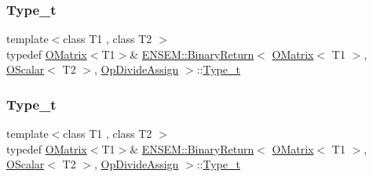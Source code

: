 \subsubsection{\texorpdfstring{Type\_t}{Type\_t}\hspace{0.1cm}{\footnotesize\ttfamily [1/3]}}
{\footnotesize\ttfamily template$<$class T1 , class T2 $>$ \\
typedef \mbox{\hyperlink{classENSEM_1_1OMatrix}{O\+Matrix}}$<$T1$>$\& \mbox{\hyperlink{structENSEM_1_1BinaryReturn}{E\+N\+S\+E\+M\+::\+Binary\+Return}}$<$ \mbox{\hyperlink{classENSEM_1_1OMatrix}{O\+Matrix}}$<$ T1 $>$, \mbox{\hyperlink{classENSEM_1_1OScalar}{O\+Scalar}}$<$ T2 $>$, \mbox{\hyperlink{structENSEM_1_1OpDivideAssign}{Op\+Divide\+Assign}} $>$\+::\mbox{\hyperlink{structENSEM_1_1BinaryReturn_3_01OMatrix_3_01T1_01_4_00_01OScalar_3_01T2_01_4_00_01OpDivideAssign_01_4_a102ea2da5914e62170be58225f52a842}{Type\+\_\+t}}}

\mbox{\label{structENSEM_1_1BinaryReturn_3_01OMatrix_3_01T1_01_4_00_01OScalar_3_01T2_01_4_00_01OpDivideAssign_01_4_a102ea2da5914e62170be58225f52a842}} 
\subsubsection{\texorpdfstring{Type\_t}{Type\_t}\hspace{0.1cm}{\footnotesize\ttfamily [2/3]}}
{\footnotesize\ttfamily template$<$class T1 , class T2 $>$ \\
typedef \mbox{\hyperlink{classENSEM_1_1OMatrix}{O\+Matrix}}$<$T1$>$\& \mbox{\hyperlink{structENSEM_1_1BinaryReturn}{E\+N\+S\+E\+M\+::\+Binary\+Return}}$<$ \mbox{\hyperlink{classENSEM_1_1OMatrix}{O\+Matrix}}$<$ T1 $>$, \mbox{\hyperlink{classENSEM_1_1OScalar}{O\+Scalar}}$<$ T2 $>$, \mbox{\hyperlink{structENSEM_1_1OpDivideAssign}{Op\+Divide\+Assign}} $>$\+::\mbox{\hyperlink{structENSEM_1_1BinaryReturn_3_01OMatrix_3_01T1_01_4_00_01OScalar_3_01T2_01_4_00_01OpDivideAssign_01_4_a102ea2da5914e62170be58225f52a842}{Type\+\_\+t}}}

